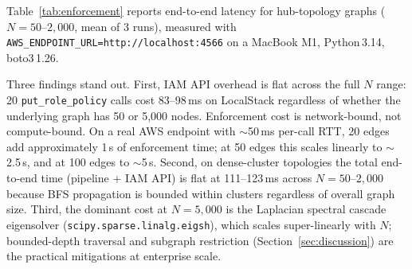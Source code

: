 \documentclass[conference,a4paper]{IEEEtran}
\begin{document}
Table~\ref{tab:enforcement} reports end-to-end latency for hub-topology
graphs ($N = 50$--$2{,}000$, mean of 3 runs), measured with
\texttt{AWS\_ENDPOINT\_URL=http://localhost:4566} on a MacBook M1,
Python\,3.14, boto3\,1.26.

\begin{table}[h]
\centering
\caption{End-to-end latency including IAM policy enforcement (hub
topology, LocalStack, 20 guard edges per run, mean of 5 runs,
percolation $n_{\text{trials}}=20$).
Pipeline\,=\,graph + propagation + ensemble + verification (no API
calls). IAM\,=\,total \texttt{put\_role\_policy} wall-clock time.
$N{=}5{,}000$ IAM\,API is estimated from measured per-call RTT.}
\label{tab:enforcement}
\end{table}

Three findings stand out.
First, IAM API overhead is flat across the full $N$ range: 20
\texttt{put\_role\_policy} calls cost 83--98\,ms on LocalStack regardless
of whether the underlying graph has 50 or 5{,}000 nodes.
Enforcement cost is network-bound, not compute-bound.
On a real AWS endpoint with $\sim$50\,ms per-call RTT, 20 edges add
approximately 1\,s of enforcement time; at 50 edges this scales
linearly to $\sim$2.5\,s, and at 100 edges to $\sim$5\,s.
Second, on dense-cluster topologies the total end-to-end time
(pipeline + IAM API) is flat at 111--123\,ms across $N = 50$--$2{,}000$
because BFS propagation is bounded within clusters regardless of overall
graph size.
Third, the dominant cost at $N{=}5{,}000$ is the Laplacian spectral
cascade eigensolver (\texttt{scipy.sparse.linalg.eigsh}), which scales
super-linearly with $N$; bounded-depth traversal and subgraph restriction
(Section~\ref{sec:discussion}) are the practical mitigations at
enterprise scale.
\end{document}
